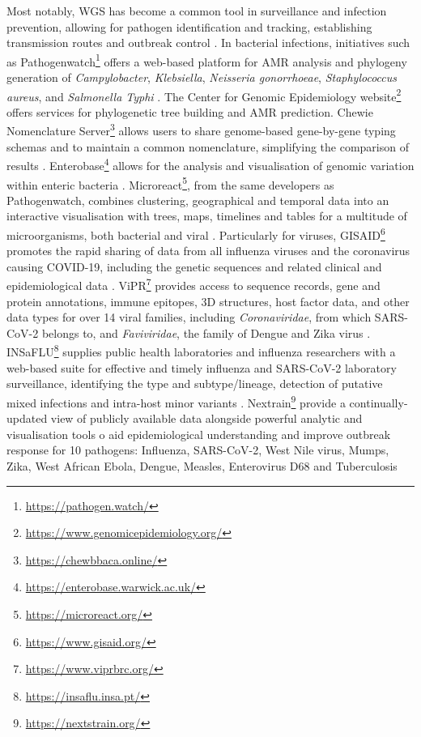 Most notably, WGS has become a common tool in surveillance and infection prevention, allowing for pathogen identification and tracking, establishing transmission routes and outbreak control \citep{lo_genomics_2020}. 
In bacterial infections, initiatives such as Pathogenwatch\footnote{\url{https://pathogen.watch/}} offers a web-based platform for AMR analysis and phylogeny generation of \textit{Campylobacter}, \textit{Klebsiella}, \textit{Neisseria gonorrhoeae}, \textit{Staphylococcus aureus}, and \textit{Salmonella Typhi} \citep{afolayan_overcoming_2021}. 
The Center for Genomic Epidemiology website\footnote{\url{https://www.genomicepidemiology.org/}} offers services for phylogenetic tree building and AMR prediction. 
Chewie Nomenclature Server\footnote{\url{https://chewbbaca.online/}} allows users to share genome-based gene-by-gene typing schemas and to maintain a common nomenclature, simplifying the comparison of results \citep{mamede_chewie_2021}. 
Enterobase\footnote{\url{https://enterobase.warwick.ac.uk/}} allows for the analysis and visualisation of genomic variation within enteric bacteria \citep{zhou_enterobase_2020}. 
Microreact\footnote{\url{https://microreact.org/}}, from the same developers as Pathogenwatch, combines clustering, geographical and temporal data into an interactive visualisation with trees, maps, timelines and tables for a multitude of microorganisms, both bacterial and viral \citep{argimon_microreact_nodate}. 
Particularly for viruses, GISAID\footnote{\url{https://www.gisaid.org/}}  promotes the rapid sharing of data from all influenza viruses and the coronavirus causing COVID-19, including the genetic sequences and related clinical and epidemiological data \citep{shu_gisaid_2017}. 
ViPR\footnote{\url{https://www.viprbrc.org/}} provides access to sequence records, gene and protein annotations, immune epitopes, 3D structures, host factor data, and other data types for over 14 viral families, including \textit{Coronaviridae}, from which SARS-CoV-2 belongs to, and \textit{Faviviridae}, the family of Dengue and Zika virus \citep{pickett_virus_2012}. 
INSaFLU\footnote{\url{https://insaflu.insa.pt/}} supplies public health laboratories and influenza researchers with a web-based suite for effective and timely influenza and SARS-CoV-2 laboratory surveillance, identifying the type and subtype/lineage, detection of putative mixed infections and intra-host minor variants \citep{borges_insaflu_2018}. 
Nextrain\footnote{\url{https://nextstrain.org/}} provide a continually-updated view of publicly available data alongside powerful analytic and visualisation tools o aid epidemiological understanding and improve outbreak response for 10 pathogens: Influenza, SARS-CoV-2, West Nile virus, Mumps, Zika, West African Ebola, Dengue, Measles, Enterovirus D68 and Tuberculosis \citep{hadfield_nextstrain_2018}

